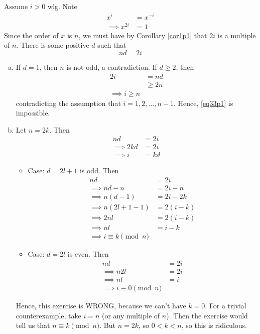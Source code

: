 \documentclass{article}
\begin{document}
\subsubsection{}
Assume $i > 0$ wlg. Note
\begin{align}
x^i &= x^{-i} \label{eq33p1} \\
\implies x^{2i} &= 1 \label{eq33p2}
\end{align}
Since the order of $x$ is $n$, we must have by Corollary \ref{cor1p1} that $2i$ is a multiple of $n$. There is some positive $d$ such that
\begin{equation*}
nd = 2i \label{eq33p3}
\end{equation*}
\begin{enumerate}[(a)]
\item If $d=1$, then $n$ is not odd, a contradiction. If $d \geq 2$, then 
\begin{align*}
2i &= nd\\
&\geq 2n\\
\implies i \geq n
\end{align*}
contradicting the assumption that $i=1,2,\ldots,n-1$. Hence, \eqref{eq33p1} is impossible.
\item Let $n=2k$. Then
\begin{align*}
nd &= 2i\\
\implies 2kd &= 2i\\
\implies i &= kd
\end{align*}
\begin{itemize}
\item Case: $d = 2l+1$ is odd. Then
\begin{align*}
nd &= 2i\\
\implies nd -n &= 2i - n\\
\implies n(d -1) &= 2i - 2k\\
\implies n(2l+1 -1) &= 2(i - k)\\
\implies 2nl &= 2(i - k)\\
\implies nl &= i - k\\
\implies i \equiv k \pmod{n}
\end{align*}
\item Case: $d = 2l$ is even. Then
\begin{align*}
nd &= 2i\\
\implies n2l &= 2i\\
\implies nl &= i\\
\implies i \equiv 0 \pmod{n}
\end{align*}
\end{itemize}
Hence, this exercise is WRONG, because we can't have $k=0$. For a trivial counterexample, take $i=n$ (or any multiple of $n$). Then the exercise would tell us that $n \equiv k \pmod{n}$. But $n=2k$, so $0<k<n$, so this is ridiculous.
\end{enumerate}
\end{document}

